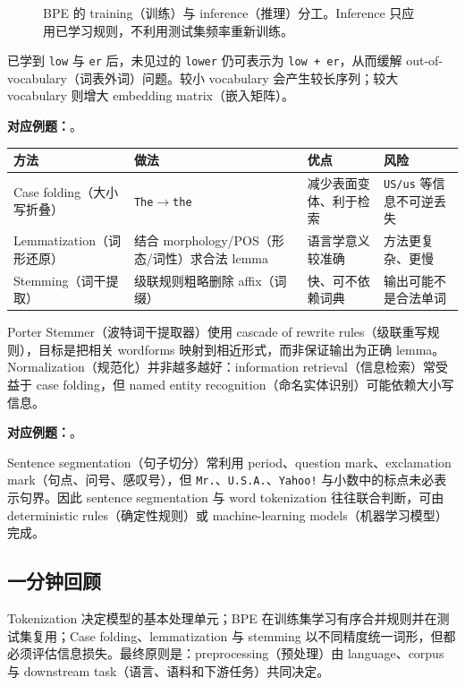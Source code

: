 \begin{figure}[htbp]
  \centering
  \resizebox{0.96\textwidth}{!}{}
  \caption{BPE 的 training（训练）与 inference（推理）分工。Inference 只应用已学习规则，不利用测试集频率重新训练。}
  \label{fig:sc4002-l02-bpe}
\end{figure}

已学到 \texttt{low} 与 \texttt{er} 后，未见过的 \texttt{lower} 仍可表示为 \texttt{low + er}，从而缓解 out-of-vocabulary（词表外词）问题。较小 vocabulary 会产生较长序列；较大 vocabulary 则增大 embedding matrix（嵌入矩阵）。

\textbf{对应例题：}。


\begin{center}
\small
\begin{tabularx}{\textwidth}{@{}>{\raggedright\arraybackslash}p{3.0cm}>{\raggedright\arraybackslash}p{4.2cm}XX@{}}
  \toprule
  方法 & 做法 & 优点 & 风险 \\
  \midrule
  Case folding（大小写折叠） & \texttt{The}$\rightarrow$\texttt{the} & 减少表面变体、利于检索 & \texttt{US/us} 等信息不可逆丢失 \\
  Lemmatization（词形还原） & 结合 morphology/POS（形态/词性）求合法 lemma & 语言学意义较准确 & 方法更复杂、更慢 \\
  Stemming（词干提取） & 级联规则粗略删除 affix（词缀） & 快、可不依赖词典 & 输出可能不是合法单词 \\
  \bottomrule
\end{tabularx}
\end{center}

Porter Stemmer（波特词干提取器）使用 cascade of rewrite rules（级联重写规则），目标是把相关 wordforms 映射到相近形式，而非保证输出为正确 lemma。Normalization（规范化）并非越多越好：information retrieval（信息检索）常受益于 case folding，但 named entity recognition（命名实体识别）可能依赖大小写信息。

\textbf{对应例题：}。


Sentence segmentation（句子切分）常利用 period、question mark、exclamation mark（句点、问号、感叹号），但 \texttt{Mr.}、\texttt{U.S.A.}、\texttt{Yahoo!} 与小数中的标点未必表示句界。因此 sentence segmentation 与 word tokenization 往往联合判断，可由 deterministic rules（确定性规则）或 machine-learning models（机器学习模型）完成。

\subsection{一分钟回顾}

Tokenization 决定模型的基本处理单元；BPE 在训练集学习有序合并规则并在测试集复用；Case folding、lemmatization 与 stemming 以不同精度统一词形，但都必须评估信息损失。最终原则是：preprocessing（预处理）由 language、corpus 与 downstream task（语言、语料和下游任务）共同决定。
